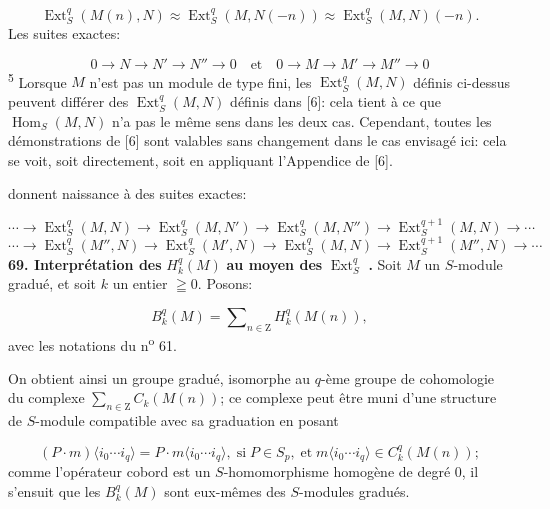 \begin{equation*}
\operatorname{Ext}_S^q(M(n), N) \approx \operatorname{Ext}_S^q(M, N(-n)) \approx \operatorname{Ext}_S^q(M, N)(-n).
\end{equation*}
Les suites exactes:

\begin{equation*}
0 \to N \to N' \to N'' \to 0 \quad \mathrm{et} \quad 0 \to M \to M' \to M'' \to 0
\end{equation*}
\textsuperscript{5} Lorsque $M$ n'est pas un module de type fini, les $\operatorname{Ext}_S^q (M, N)$ définis ci-dessus peuvent différer des $\operatorname{Ext}_S^q (M, N)$ définis dans [6]: cela tient à ce que $\operatorname{Hom}_S (M, N)$ n'a pas le même sens dans les deux cas. Cependant, toutes les démonstrations de [6] sont valables sans changement dans le cas envisagé ici: cela se voit, soit directement, soit en appliquant l'Appendice de [6].



 donnent naissance à des suites exactes:

\begin{equation*}
\cdots \to \operatorname{Ext}_S^q(M, N) \to \operatorname{Ext}_S^q(M, N') \to \operatorname{Ext}_S^q(M, N'') \to \operatorname{Ext}_S^{q+1}(M, N) \to \cdots
\end{equation*}
\begin{equation*}
\cdots \to \operatorname{Ext}_S^q(M'', N) \to \operatorname{Ext}_S^q(M', N) \to \operatorname{Ext}_S^q(M, N) \to \operatorname{Ext}_S^{q+1}(M'', N) \to \cdots
\end{equation*}
\textbf{69. Interprétation des} $H_k^q(M)$ \textbf{au moyen des} $\operatorname{Ext}_S^q$ \textbf{.} Soit $M$ un $S$-module gradué, et soit $k$ un entier $\geqq 0$. Posons:

\begin{equation*}
B_k^q(M) = \sum\nolimits_{n \in \mathrm{Z}} H_k^q(M(n)),
\end{equation*}
avec les notations du n\textsuperscript{o} 61.

On obtient ainsi un groupe gradué, isomorphe au $q$-ème groupe de cohomologie du complexe $\sum\nolimits_{n \in \mathrm{Z}} C_k(M(n))$; ce complexe peut être muni d'une structure de $S$-module compatible avec sa graduation en posant

\begin{equation*}
(P \cdot m)\langle i_0 \cdots i_q \rangle = P \cdot m \langle i_0 \cdots i_q \rangle, \; \mathrm{si} \; P \in S_p , \; \mathrm{et} \; m \langle i_0 \cdots i_q \rangle \in C_k^q(M(n));
\end{equation*}
comme l'opérateur cobord est un $S$-homomorphisme homogène de degré 0, il s'ensuit que les $B_k^q(M)$ sont eux-mêmes des $S$-modules gradués.

